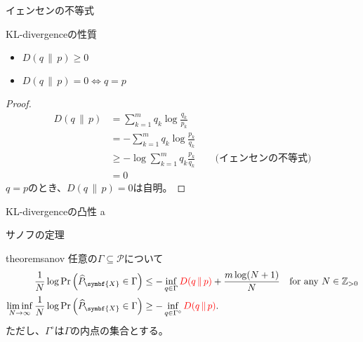\documentclass[lualatex,handout]{beamer}
\newcommand{\mycolor}[2]{%
  \begingroup
  \colorlet{currentcolor}{.}%
  \color{#1}#2%
  \color{currentcolor}%
  \endgroup
}
\newcommand{\emm}[1]{\mycolor{red}{#1}}
\newcommand\KL[2]{D(#1\,\|\,#2)}
\theoremstyle{definition}
\begin{document}
\begin{frame}{イェンセンの不等式}
\end{frame}

\begin{frame}{KL-divergenceの性質}
\begin{lemma}
\begin{itemize}
\item $\KL{q}{p}\ge 0$
\item $\KL{q}{p}= 0\iff q=p$
\end{itemize}
\end{lemma}
\begin{proof}
\begin{align*}
\KL{q}{p} &= \sum_{k=1}^m q_k\log \frac{q_k}{p_k}\\
&= -\sum_{k=1}^m q_k\log \frac{p_k}{q_k}\\
&\ge -\log \sum_{k=1}^m q_k\frac{p_k}{q_k}\qquad\text{(イェンセンの不等式)}\\
&=0
\end{align*}
$q=p$のとき、$\KL{q}{p}=0$は自明。
\end{proof}
\end{frame}

\begin{frame}{KL-divergenceの凸性}
a
\end{frame}

\begin{frame}{サノフの定理}
\begin{restatable}[サノフの定理]{theorem}{sanov}
\footnotesize
任意の$\Gamma\subseteq\mathcal{P}$について
\begin{align*}
\frac1N\log\Pr\left(\widehat{P}_{\symbf{X}} \in \Gamma\right) &\le -\inf_{q\in \Gamma} \emm{\KL{q}{p}} + \frac{m\log(N+1)}N\quad\text{for any $N\in\mathbb{Z}_{>0}$}\\
\liminf_{N\to\infty}\frac1N\log \Pr\left(\widehat{P}_{\symbf{X}} \in \Gamma\right) &\ge -\inf_{q\in \Gamma^\circ} \emm{\KL{q}{p}}.
\end{align*}
ただし、$\Gamma^\circ$は$\Gamma$の内点の集合とする。
\end{restatable}
\end{frame}
\end{document}
